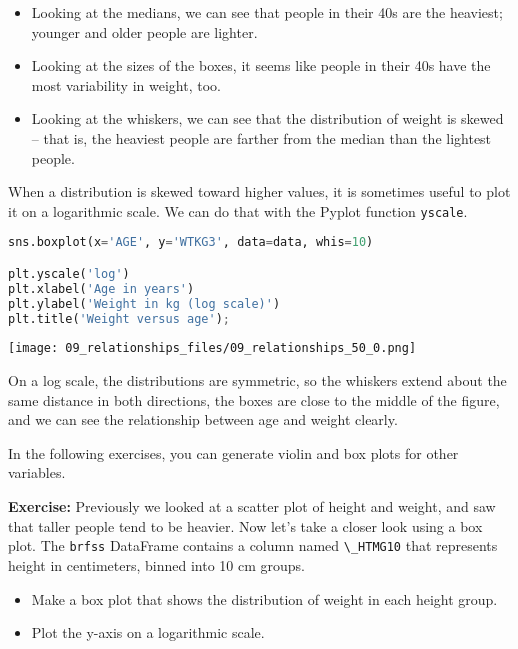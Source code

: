 \begin{itemize}
\item
  Looking at the medians, we can see that people in their 40s are the
  heaviest; younger and older people are lighter.
\item
  Looking at the sizes of the boxes, it seems like people in their 40s
  have the most variability in weight, too.
\item
  Looking at the whiskers, we can see that the distribution of weight is
  skewed -- that is, the heaviest people are farther from the median
  than the lightest people.
\end{itemize}

When a distribution is skewed toward higher values, it is sometimes
useful to plot it on a logarithmic scale. We can do that with the Pyplot
function \passthrough{\lstinline!yscale!}.

\begin{lstlisting}[language=Python,style=source]
sns.boxplot(x='AGE', y='WTKG3', data=data, whis=10)

plt.yscale('log')
plt.xlabel('Age in years')
plt.ylabel('Weight in kg (log scale)')
plt.title('Weight versus age');
\end{lstlisting}

\begin{center}
\texttt{[image: 09\_relationships\_files/09\_relationships\_50\_0.png]}
\end{center}

On a log scale, the distributions are symmetric, so the whiskers extend
about the same distance in both directions, the boxes are close to the
middle of the figure, and we can see the relationship between age and
weight clearly.

In the following exercises, you can generate violin and box plots for
other variables.

\textbf{Exercise:} Previously we looked at a scatter plot of height and
weight, and saw that taller people tend to be heavier. Now let's take a
closer look using a box plot. The \passthrough{\lstinline!brfss!}
DataFrame contains a column named \passthrough{\lstinline!\_HTMG10!}
that represents height in centimeters, binned into 10 cm groups.

\begin{itemize}
\item
  Make a box plot that shows the distribution of weight in each height
  group.
\item
  Plot the y-axis on a logarithmic scale.
\end{itemize}

